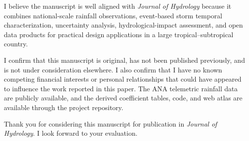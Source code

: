 \documentclass[10pt,a4paper,roman]{moderncv}
\begin{document}
I believe the manuscript is well aligned with \textit{Journal of Hydrology} because it combines national-scale rainfall observations, event-based storm temporal characterization, uncertainty analysis, hydrological-impact assessment, and open data products for practical design applications in a large tropical--subtropical country.

I confirm that this manuscript is original, has not been published previously, and is not under consideration elsewhere. I also confirm that I have no known competing financial interests or personal relationships that could have appeared to influence the work reported in this paper. The ANA telemetric rainfall data are publicly available, and the derived coefficient tables, code, and web atlas are available through the project repository.

Thank you for considering this manuscript for publication in \textit{Journal of Hydrology}. I look forward to your evaluation.

\makeletterclosing
\end{document}

